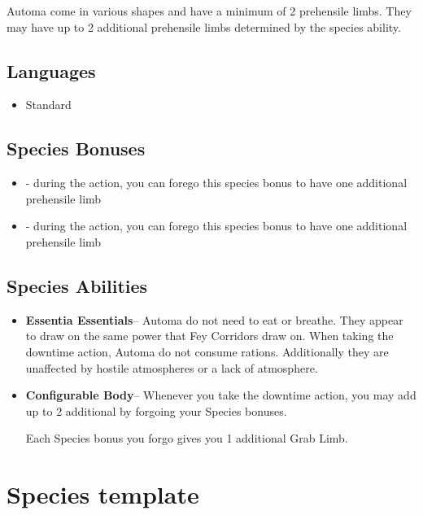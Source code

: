 {Automa come in various shapes and have a minimum of 2 prehensile limbs. They may have up to 2 additional prehensile limbs determined by the  species ability.

\subsection*{Languages}
\begin{itemize}
	\item Standard
\end{itemize}

\subsection*{Species Bonuses}
\begin{itemize}
	\item {} - during the  action, you can forego this species bonus to have one additional prehensile limb
	\item {} -  during the  action, you can forego this species bonus to have one additional prehensile limb
\end{itemize}

\subsection*{Species Abilities}
\begin{itemize}
	\item \textbf{Essentia Essentials}-- Automa do not need to eat or breathe. They appear to draw on the same power that Fey Corridors draw on. When taking the  downtime action, Automa do not consume rations. Additionally they are unaffected by hostile atmospheres or a lack of atmosphere. 
	\item \textbf{Configurable Body}-- Whenever you take the  downtime action, you may add up to 2 additional  by forgoing your Species bonuses.

	Each Species bonus you forgo gives you 1 additional Grab Limb.
\end{itemize}

\GRPpagebreak
\section{Species template}

}
